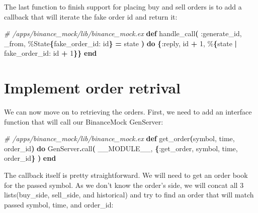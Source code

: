 \documentclass[
  oneside]{book}
\newenvironment{Shaded}{\begin{snugshade}}{\end{snugshade}}
\newcommand{\CommentTok}[1]{\textcolor[rgb]{0.56,0.35,0.01}{\textit{#1}}}
\newcommand{\ConstantTok}[1]{\textcolor[rgb]{0.56,0.35,0.01}{#1}}
\newcommand{\DecValTok}[1]{\textcolor[rgb]{0.00,0.00,0.81}{#1}}
\newcommand{\FunctionTok}[1]{\textcolor[rgb]{0.13,0.29,0.53}{\textbf{#1}}}
\newcommand{\KeywordTok}[1]{\textcolor[rgb]{0.13,0.29,0.53}{\textbf{#1}}}
\newcommand{\NormalTok}[1]{#1}
\newcommand{\OperatorTok}[1]{\textcolor[rgb]{0.81,0.36,0.00}{\textbf{#1}}}
\newcommand{\VariableTok}[1]{\textcolor[rgb]{0.00,0.00,0.00}{#1}}
\begin{document}
The last function to finish support for placing buy and sell orders is to add a callback that will iterate the fake order id and return it:

\begin{Shaded}
\begin{Highlighting}[]
\CommentTok{\# /apps/binance\_mock/lib/binance\_mock.ex}
  \KeywordTok{def}\NormalTok{ handle\_call}\FunctionTok{(}
        \VariableTok{:generate\_id}\NormalTok{,}
\NormalTok{        \_from,}
\NormalTok{        \%}\ConstantTok{State}\FunctionTok{\{}\VariableTok{fake\_order\_id:}\NormalTok{ id}\FunctionTok{\}} \OperatorTok{=}\NormalTok{ state}
      \FunctionTok{)} \KeywordTok{do}
    \FunctionTok{\{}\VariableTok{:reply}\NormalTok{, id }\OperatorTok{+} \DecValTok{1}\NormalTok{, \%}\FunctionTok{\{}\NormalTok{state }\OperatorTok{|} \VariableTok{fake\_order\_id:}\NormalTok{ id }\OperatorTok{+} \DecValTok{1}\FunctionTok{\}\}}
  \KeywordTok{end}
\end{Highlighting}
\end{Shaded}

\section{Implement order retrival}\label{implement-order-retrival}

We can now move on to retrieving the orders. First, we need to add an interface function that will call our BinanceMock GenServer:

\begin{Shaded}
\begin{Highlighting}[]
\CommentTok{\# /apps/binance\_mock/lib/binance\_mock.ex}
  \KeywordTok{def}\NormalTok{ get\_order}\FunctionTok{(}\NormalTok{symbol, time, order\_id}\FunctionTok{)} \KeywordTok{do}
    \ConstantTok{GenServer}\OperatorTok{.}\NormalTok{call}\FunctionTok{(}
      \ConstantTok{\_\_MODULE\_\_}\NormalTok{,}
      \FunctionTok{\{}\VariableTok{:get\_order}\NormalTok{, symbol, time, order\_id}\FunctionTok{\}}
    \FunctionTok{)}
  \KeywordTok{end}
\end{Highlighting}
\end{Shaded}

\newpage

The callback itself is pretty straightforward. We will need to get an order book for the passed symbol. As we don't know the order's side, we will concat all 3 lists(buy\_side, sell\_side, and historical) and try to find an order that will
match passed symbol, time, and order\_id:
\end{document}
